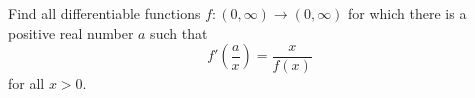 Find all differentiable functions $f: (0, \infty) \to (0, \infty)$ for which
there is a positive real number $a$ such that
\[
f' \left( \frac{a}{x} \right) = \frac{x}{f(x)}
\]
for all $x > 0$.
